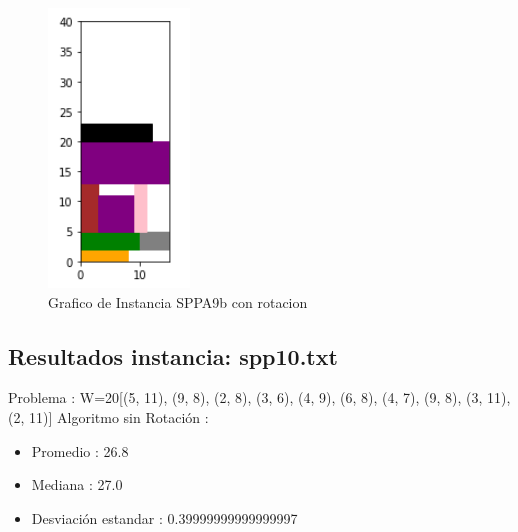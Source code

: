 \documentclass[10pt]{article}
\begin{document}
\begin{figure}[H]
\centerline{\includegraphics[width=0.5\linewidth]{2_con_rotar.jpg}}
\caption{Grafico de Instancia SPPA9b con rotacion}
\label{fig_4}
\end{figure} 


\subsection{Resultados instancia: spp10.txt}%
\label{subsec:Resultadosinstanciaspp10.txt}%
Problema : W=20{[}(5, 11), (9, 8), (2, 8), (3, 6), (4, 9), (6, 8), (4, 7), (9, 8), (3, 11), (2, 11){]} \newline%
%
 Algoritmo sin Rotación : %
\begin{itemize}%
\item%
Promedio : 26.8%
\item%
Mediana : 27.0%
\item%
Desviación estandar : 0.39999999999999997%
\end{itemize}
\end{document}
